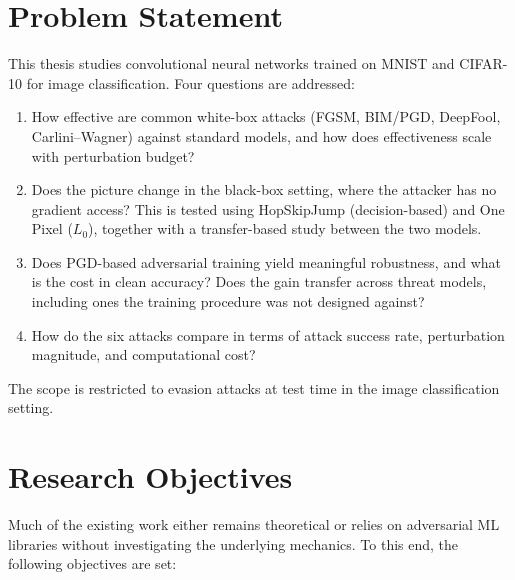 \section{Problem Statement}

This thesis studies convolutional neural networks trained on MNIST and CIFAR-10 for image classification. Four questions are addressed:

\begin{enumerate}
    \item How effective are common white-box attacks (FGSM, BIM/PGD, DeepFool, Carlini--Wagner) against standard models, and how does effectiveness scale with perturbation budget?
    \item Does the picture change in the black-box setting, where the attacker has no gradient access? This is tested using HopSkipJump (decision-based) and One Pixel ($L_0$), together with a transfer-based study between the two models.
    \item Does PGD-based adversarial training yield meaningful robustness, and what is the cost in clean accuracy? Does the gain transfer across threat models, including ones the training procedure was not designed against?
    \item How do the six attacks compare in terms of attack success rate, perturbation magnitude, and computational cost?
\end{enumerate}

The scope is restricted to evasion attacks at test time in the image classification setting.

\section{Research Objectives}

Much of the existing work either remains theoretical or relies on adversarial ML libraries without investigating the underlying mechanics. To this end, the following objectives are set:

